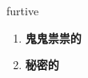 
\begin{frame}
{\huge furtive}
\begin{center}
\begin{enumerate}\Large
  \item \textbf{鬼鬼祟祟的}
  \item \textbf{秘密的}
\end{enumerate}
\end{center}
\end{frame}
